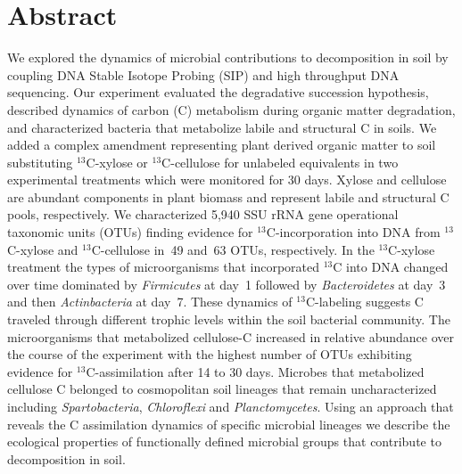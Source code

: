 \section{Abstract} We explored the dynamics of microbial contributions to
decomposition in soil by coupling DNA Stable Isotope Probing (SIP) and high
throughput DNA sequencing. Our experiment evaluated the degradative succession
hypothesis, described dynamics of carbon (C) metabolism during organic matter
degradation, and characterized bacteria that metabolize labile and structural
C in soils. We added a complex amendment representing plant derived organic
matter to soil substituting $^{13}$C-xylose or $^{13}$C-cellulose for unlabeled
equivalents in two experimental treatments which were monitored for 30 days.
Xylose and cellulose are abundant components in plant biomass and represent
labile and structural C pools, respectively. We characterized 5,940 SSU rRNA
gene operational taxonomic units (OTUs) finding evidence for
$^{13}$C-incorporation into DNA from $^{13}$C-xylose and $^{13}$C-cellulose
in~49 and~63 OTUs, respectively. In the $^{13}$C-xylose treatment the types of
microorganisms that incorporated $^{13}$C into DNA changed over time dominated
by \textit{Firmicutes} at day~1 followed by \textit{Bacteroidetes} at day~3 and
then \textit{Actinbacteria} at day~7. These dynamics of $^{13}$C-labeling
suggests C traveled through different trophic levels within the soil bacterial
community. The microorganisms that metabolized cellulose-C increased in
relative abundance over the course of the experiment with the highest number of
OTUs exhibiting evidence for $^{13}$C-assimilation after 14 to 30 days.
Microbes that metabolized cellulose C belonged to cosmopolitan soil lineages
that remain uncharacterized including \textit{Spartobacteria},
\textit{Chloroflexi} and \textit{Planctomycetes}. Using an approach that
reveals the C assimilation dynamics of specific microbial lineages we describe
the ecological properties of functionally defined microbial groups that
contribute to decomposition in soil.
